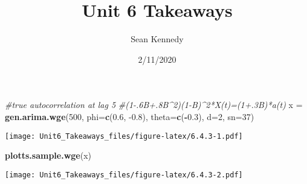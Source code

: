 \documentclass[]{article}
\title{Unit 6 Takeaways}
\author{Sean Kennedy}
\date{2/11/2020}
\newenvironment{Shaded}{\begin{snugshade}}{\end{snugshade}}
\newcommand{\CommentTok}[1]{\textcolor[rgb]{0.56,0.35,0.01}{\textit{#1}}}
\newcommand{\DataTypeTok}[1]{\textcolor[rgb]{0.13,0.29,0.53}{#1}}
\newcommand{\DecValTok}[1]{\textcolor[rgb]{0.00,0.00,0.81}{#1}}
\newcommand{\FloatTok}[1]{\textcolor[rgb]{0.00,0.00,0.81}{#1}}
\newcommand{\KeywordTok}[1]{\textcolor[rgb]{0.13,0.29,0.53}{\textbf{#1}}}
\newcommand{\NormalTok}[1]{#1}
\newcommand{\OperatorTok}[1]{\textcolor[rgb]{0.81,0.36,0.00}{\textbf{#1}}}
\newcommand{\StringTok}[1]{\textcolor[rgb]{0.31,0.60,0.02}{#1}}
\begin{document}
\maketitle

\begin{Shaded}
\begin{Highlighting}[]
\CommentTok{#true autocorrelation at lag 5}
\CommentTok{#(1-.6B+.8B^2)(1-B)^2*X(t)=(1+.3B)*a(t)}
\NormalTok{x =}\StringTok{ }\KeywordTok{gen.arima.wge}\NormalTok{(}\DecValTok{500}\NormalTok{, }\DataTypeTok{phi=}\KeywordTok{c}\NormalTok{(}\FloatTok{0.6}\NormalTok{, }\FloatTok{-0.8}\NormalTok{), }\DataTypeTok{theta=}\KeywordTok{c}\NormalTok{(}\OperatorTok{-}\FloatTok{0.3}\NormalTok{), }\DataTypeTok{d=}\DecValTok{2}\NormalTok{, }\DataTypeTok{sn=}\DecValTok{37}\NormalTok{)}
\end{Highlighting}
\end{Shaded}

\texttt{[image: Unit6\_Takeaways\_files/figure-latex/6.4.3-1.pdf]}

\begin{Shaded}
\begin{Highlighting}[]
\KeywordTok{plotts.sample.wge}\NormalTok{(x)}
\end{Highlighting}
\end{Shaded}

\texttt{[image: Unit6\_Takeaways\_files/figure-latex/6.4.3-2.pdf]}
\end{document}

